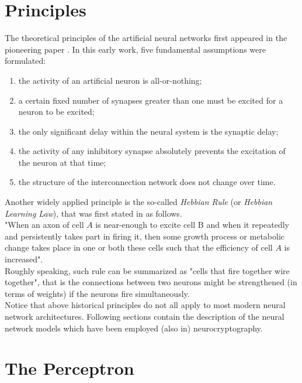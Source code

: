 \documentclass[%
    corpo=11pt,
    twoside,
    stile=classica,
    oldstyle,
    autoretitolo,
    tipotesi=magistrale,
    greek,
    evenboxes,
    english
]{toptesi}
\begin{document}
\section{Principles}
\begin{singlespace}
The theoretical principles of the artificial neural networks first appeared in the pioneering paper \cite{mcculloch}. In this early work, five fundamental assumptions were formulated:
\end{singlespace}
\begin{enumerate}
\item the activity of an artificial neuron is all-or-nothing;
\item a certain fixed number of synapses greater than one must be excited for a neuron to be excited;
\item the only significant delay within the neural system is the synaptic delay;
\item the activity of any inhibitory synapse absolutely prevents the excitation of the neuron at that time;
\item the structure of the interconnection network does not change over time.
\end{enumerate}
Another widely applied principle is the so-called \textit{Hebbian Rule} (or \textit{Hebbian Learning Law}), that was first stated in \cite{hebb} as follows. \\
"When an axon of cell $A$ is near-enough to excite cell B and when it repeatedly and persistently takes part in firing it, then some growth process or metabolic change takes place in one or both these cells such that the efficiency of cell $A$ is increased". \\
Roughly speaking, such rule can be summarized as "cells that fire together wire together", that is the connections between two neurons might be strengthened (in terms of weights) if the neurons fire simultaneously. \\
Notice that above historical principles do not all apply to most modern neural network architectures. Following sections contain the description of the neural network models which have been employed (also in) neurocryptography.
\newpage
\section{The Perceptron}
\end{document}

